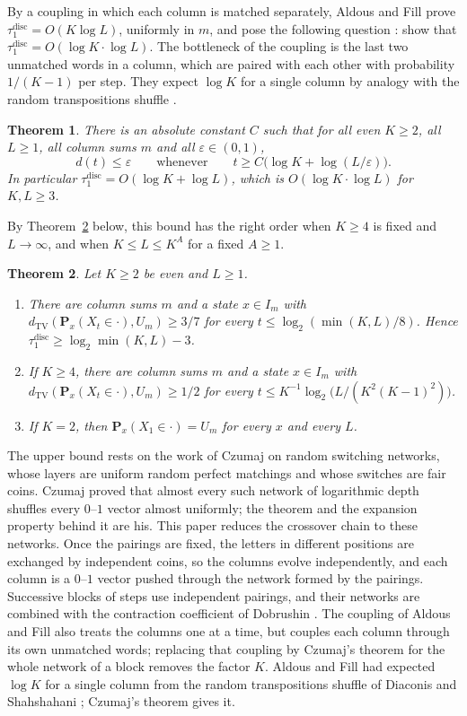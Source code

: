 \documentclass[11pt]{amsart}
\newtheorem{theorem}{Theorem}[section]
\theoremstyle{remark}
\numberwithin{equation}{section}
\newcommand{\TV}{d_{\mathrm{TV}}}
\newcommand{\Pm}{\mathbf P}
\begin{document}
By a coupling in which each column is matched separately, Aldous and Fill prove $\tau_1^{\mathrm{disc}}=O(K\log L)$, uniformly in $m$, and pose the following question \cite[Open Problem~12.5]{AF}: show that $\tau_1^{\mathrm{disc}}=O(\log K\cdot\log L)$. The bottleneck of the coupling is the last two unmatched words in a column, which are paired with each other with probability $1/(K-1)$ per step. They expect $\log K$ for a single column by analogy with the random transpositions shuffle \cite{DS81}.

\begin{theorem}\label{thm:upper}
There is an absolute constant $C$ such that for all even $K\ge2$, all $L\ge1$, all column sums $m$ and all $\varepsilon\in(0,1)$,
\[
d(t)\le\varepsilon\qquad\text{whenever}\qquad t\ge C\bigl(\log K+\log(L/\varepsilon)\bigr).
\]
In particular $\tau_1^{\mathrm{disc}}=O(\log K+\log L)$, which is $O(\log K\cdot\log L)$ for $K,L\ge3$.
\end{theorem}

By Theorem~\ref{thm:lower} below, this bound has the right order when $K\ge4$ is fixed and $L\to\infty$, and when $K\le L\le K^{A}$ for a fixed $A\ge1$.

\begin{theorem}\label{thm:lower}
Let $K\ge2$ be even and $L\ge1$.
\begin{enumerate}[label=\textup{(\alph*)}]
\item There are column sums $m$ and a state $x\in I_m$ with $\TV(\Pm_x(X_t\in\cdot),U_m)\ge3/7$ for every $t\le\log_2(\min(K,L)/8)$. Hence $\tau_1^{\mathrm{disc}}\ge\log_2\min(K,L)-3$.
\item If $K\ge4$, there are column sums $m$ and a state $x\in I_m$ with $\TV(\Pm_x(X_t\in\cdot),U_m)\ge1/2$ for every $t\le K^{-1}\log_2\bigl(L/(K^2(K-1)^2)\bigr)$.
\item If $K=2$, then $\Pm_x(X_1\in\cdot)=U_m$ for every $x$ and every $L$.
\end{enumerate}
\end{theorem}

The upper bound rests on the work of Czumaj \cite{Cz15} on random switching networks, whose layers are uniform random perfect matchings and whose switches are fair coins. Czumaj proved that almost every such network of logarithmic depth shuffles every $0$--$1$ vector almost uniformly; the theorem and the expansion property behind it are his. This paper reduces the crossover chain to these networks. Once the pairings are fixed, the letters in different positions are exchanged by independent coins, so the columns evolve independently, and each column is a $0$--$1$ vector pushed through the network formed by the pairings. Successive blocks of steps use independent pairings, and their networks are combined with the contraction coefficient of Dobrushin \cite{Do56}. The coupling of Aldous and Fill also treats the columns one at a time, but couples each column through its own unmatched words; replacing that coupling by Czumaj's theorem for the whole network of a block removes the factor $K$. Aldous and Fill had expected $\log K$ for a single column from the random transpositions shuffle of Diaconis and Shahshahani \cite{DS81}; Czumaj's theorem gives it.
\end{document}
